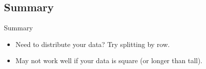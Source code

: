 \subsection{Summary}
\makesubcontentsslidessec


\begin{frame}[fragile]
  \begin{block}{Summary}\pause
    \begin{itemize}
      \item Need to distribute your data? Try splitting by row.
      \item May not work well if your data is square (or longer than tall).
    \end{itemize}
\end{block}
\end{frame}